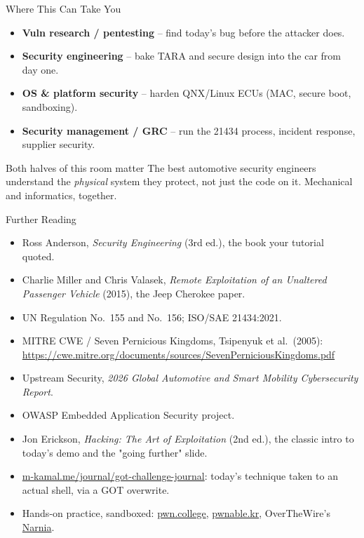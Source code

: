 \begin{frame}{Where This Can Take You}
  \begin{itemize}
    \item \textbf{Vuln research / pentesting} -- find today's bug before the attacker does.
    \item \textbf{Security engineering} -- bake TARA and secure design into the car from day one.
    \item \textbf{OS \& platform security} -- harden QNX/Linux ECUs (MAC, secure boot, sandboxing).
    \item \textbf{Security management / GRC} -- run the 21434 process, incident response, supplier security.
  \end{itemize}
  \vspace{1mm}
  \begin{alertblock}{Both halves of this room matter}
    The best automotive security engineers understand the \emph{physical} system they protect, not just the code on it. Mechanical and informatics, together.
  \end{alertblock}
\end{frame}

\begin{frame}{Further Reading}
  \footnotesize
  \setlength{\itemsep}{0pt}
  \begin{itemize}
    \item Ross Anderson, \emph{Security Engineering} (3rd ed.), the book your tutorial quoted.
    \item Charlie Miller and Chris Valasek, \emph{Remote Exploitation of an Unaltered Passenger Vehicle} (2015), the Jeep Cherokee paper.
    \item UN Regulation No.\ 155 and No.\ 156; ISO/SAE 21434:2021.
    \item MITRE CWE / Seven Pernicious Kingdoms, Tsipenyuk et al.\ (2005): \url{https://cwe.mitre.org/documents/sources/SevenPerniciousKingdoms.pdf}
    \item Upstream Security, \emph{2026 Global Automotive and Smart Mobility Cybersecurity Report}.
    \item OWASP Embedded Application Security project.
    \item Jon Erickson, \emph{Hacking: The Art of Exploitation} (2nd ed.), the classic intro to today's demo and the "going further" slide.
    \item \href{https://m-kamal.me/journal/got-challenge-journal/}{m-kamal.me/journal/got-challenge-journal}: today's technique taken to an actual shell, via a GOT overwrite.
    \item Hands-on practice, sandboxed: \href{https://pwn.college}{pwn.college}, \href{https://pwnable.kr}{pwnable.kr}, OverTheWire's \href{https://overthewire.org/wargames/narnia/}{Narnia}.
  \end{itemize}
\end{frame}

